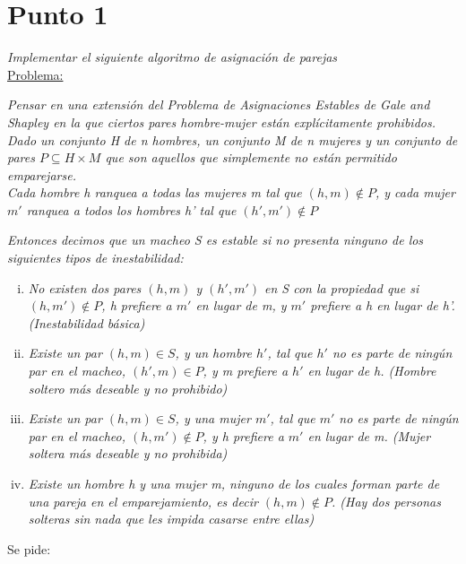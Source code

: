 \section{Punto 1}
\textit{ Implementar el siguiente algoritmo de asignación de parejas}
\\
\underline{Problema:}

\textit{Pensar en una extensión del Problema de Asignaciones Estables de Gale and Shapley en la que ciertos pares hombre-mujer están explícitamente prohibidos.}\\

\textit{Dado un conjunto H de n hombres, un conjunto M de n mujeres y un conjunto de pares $P\subseteq H \times M$ que son aquellos que simplemente no están permitido emparejarse.}\\

\textit{Cada hombre h ranquea a todas las mujeres m tal que $(h, m) \notin P$, y cada mujer $m'$ ranquea a todos los hombres h' tal que $(h', m') \notin P$}

\textit{Entonces decimos que un macheo S es estable si no presenta ninguno de los siguientes tipos de inestabilidad:}

\begin{enumerate}[(i)]
  \item \textit{No existen dos pares $(h, m)$ y $(h', m')$ en S con la propiedad que si $(h, m') \notin P$, h prefiere a $m'$ en lugar de m, y $m'$ prefiere a h en lugar de h'. (Inestabilidad básica)}
  
  \item \textit{ Existe un par $(h, m) \in S$, y un hombre $h'$, tal que $h'$ no es parte de ningún par en el macheo, $(h', m) \in P$, y m prefiere a $h'$ en lugar de h. (Hombre soltero más deseable y no prohibido)}

  \item \textit{Existe un par $(h, m) \in S$, y una mujer $m'$, tal que $m'$ no es parte de ningún par en el macheo, $(h, m') \notin P$, y h prefiere a $m'$ en lugar de m. (Mujer soltera más deseable y no prohibida)}

  \item \textit{Existe un hombre h y una mujer m, ninguno de los cuales forman parte de una pareja en el emparejamiento, es decir $(h, m) \notin P$. (Hay dos personas solteras sin nada que les impida casarse entre ellas)}
\end{enumerate}

Se pide:

